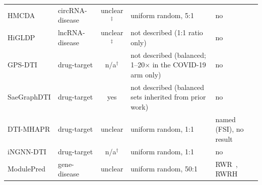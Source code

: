 \begin{table}[h!]
{\begin{tabular}{llcll}
HMCDA \cite{liang2023hmcda} & circRNA-disease & unclear$^{\ddagger}$ & uniform random, 5:1 & no \\
HiGLDP \cite{wang2026higldp} & lncRNA-disease & unclear$^{\ddagger}$ & not described (1:1 ratio only) & no \\
GPS-DTI \cite{xiong2025gpsdti} & drug-target & n/a$^{\dagger}$ & not described (balanced; 1--20$\times$ in the COVID-19 arm only) & no \\
SaeGraphDTI \cite{zhang2025saegraphdti} & drug-target & yes & not described (balanced sets inherited from prior work) & no \\
DTI-MHAPR \cite{yang2025dtimhapr} & drug-target & unclear & uniform random, 1:1 & named (FSI), no result \\
iNGNN-DTI \cite{sun2024ingnndti} & drug-target & n/a$^{\dagger}$ & uniform random, 1:1 & no \\
ModulePred \cite{jia2024modulepred} & gene-disease & unclear & uniform random, 50:1 & RWR~\cite{tong2006rwr}, RWRH~\cite{li2010rwrh} \\
\hline
\end{tabular}
}


\end{table}
